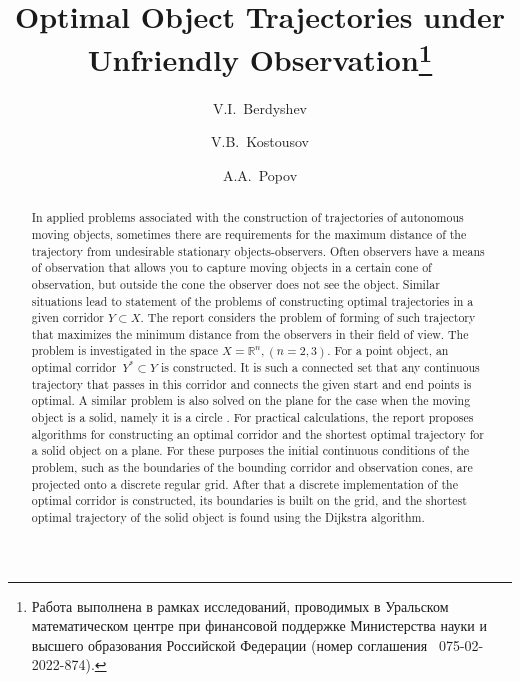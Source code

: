 \begin{englishtitle} %
\title{Optimal Object Trajectories under Unfriendly Observation\thanks{Работа выполнена в рамках исследований, проводимых в Уральском математическом центре при финансовой поддержке Министерства науки и высшего образования Российской Федерации (номер соглашения \textnumero~075-02-2022-874). }}
\author{V.I.~Berdyshev 
  \and
  V.B.~Kostousov 
  \and
  A.A.~Popov 
}
\institute{IMM UrB RAS, Ekaterinburg, Russia\\
  \email{bvi@imm.uran.ru,  vkost@imm.uran.ru, aap@imm.uran.ru}
}

\maketitle

\begin{abstract}
In applied problems associated with the construction of trajectories of autonomous moving objects, sometimes there are requirements for the maximum distance of the trajectory from undesirable stationary objects-observers.  Often observers have a means of observation that allows you to capture moving objects in a certain cone of observation, but outside the cone the observer does not see the object.
Similar situations lead to statement of the problems of constructing optimal trajectories in a given corridor $ Y\subset X $.
The report considers the problem of forming of such trajectory that maximizes the minimum distance from the observers in their field of view. The problem is investigated in the space $X=\mathbb{R}^n, (n=2,3)$.
For a point object, an optimal corridor~$Y^* \subset Y$ is constructed. It is such a connected set that any continuous trajectory that passes in this corridor and connects the given start and end points is optimal.
A similar problem is also solved on the plane for the case when the moving object is a solid, namely it is a circle \cite{Berdyshev}.
For practical calculations, the report proposes algorithms for constructing an optimal corridor and the shortest optimal trajectory for a solid object on a plane.
For these purposes the initial continuous conditions of the problem, such as the boundaries of the bounding corridor and observation cones, are projected onto a discrete regular grid.  After that a discrete implementation of the optimal corridor is constructed, its boundaries is built on the grid, and the shortest optimal trajectory of the solid object is found using the Dijkstra algorithm.

\end{abstract}
\end{englishtitle}


